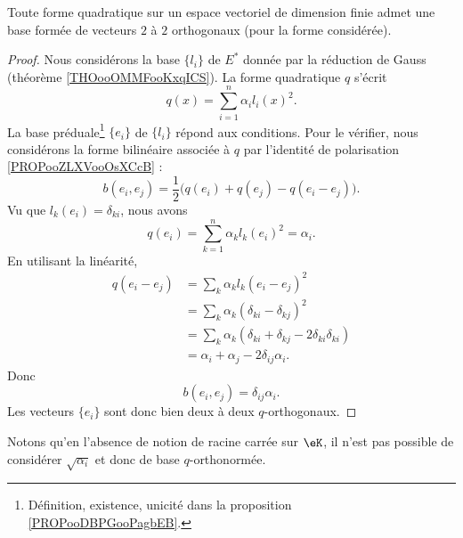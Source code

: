 \begin{theorem}       \label{THOooIDMPooIMwkqB}
    Toute forme quadratique sur un espace vectoriel de dimension finie admet une base formée de vecteurs \( 2\) à \( 2\) orthogonaux (pour la forme considérée).
\end{theorem}

\begin{proof}
    Nous considérons la base \(  \{ l_i \}    \) de \( E^*\) donnée par la réduction de Gauss (théorème \ref{THOooOMMFooKxqICS}). La forme quadratique \( q\) s'écrit
    \begin{equation}
        q(x)=\sum_{i=1}^n\alpha_il_i(x)^2.
    \end{equation}
    La base préduale\footnote{Définition, existence, unicité dans la proposition \ref{PROPooDBPGooPagbEB}.} \( \{ e_i \}\) de \( \{ l_i \}\) répond aux conditions. Pour le vérifier, nous considérons la forme bilinéaire associée à \( q\) par l'identité de polarisation \ref{PROPooZLXVooOsXCcB} :
    \begin{equation}
        b(e_i,e_j)=\frac{ 1 }{2}\big( q(e_i)+q(e_j)-q(e_i-e_j) \big).
    \end{equation}
    Vu que \( l_k(e_i)=\delta_{ki}\), nous avons
    \begin{equation}
        q(e_i)=\sum_{k=1}^n\alpha_kl_k(e_i)^2=\alpha_i.
    \end{equation}
    En utilisant la linéarité,
    \begin{subequations}
        \begin{align}
            q(e_i-e_j)&=\sum_k\alpha_kl_k(e_i-e_j)^2\\
            &=\sum_k\alpha_k(\delta_{ki}-\delta_{kj})^2\\
            &=\sum_k\alpha_k(\delta_{ki}+\delta_{kj}-2\delta_{ki}\delta_{ki})\\
            &=\alpha_i+\alpha_j-2\delta_{ij}\alpha_i.
        \end{align}
    \end{subequations}
    Donc 
    \begin{equation}
        b(e_i,e_j)=\delta_{ij}\alpha_i.
    \end{equation}
    Les vecteurs \( \{ e_i \}\) sont donc bien deux à deux \( q\)-orthogonaux.
\end{proof}

Notons qu'en l'absence de notion de racine carrée sur \( \eK\), il n'est pas possible de considérer \( \sqrt{ \alpha_i }\) et donc de base \( q\)-orthonormée.

